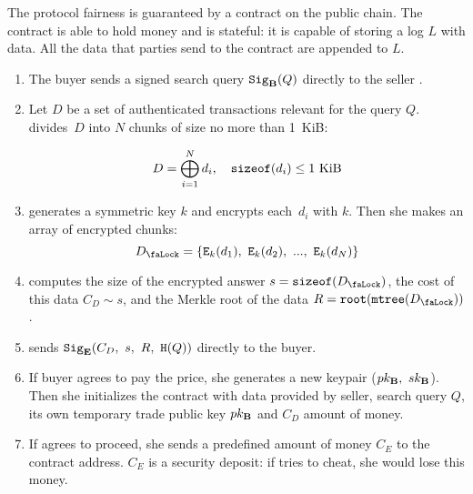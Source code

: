 The protocol fairness is guaranteed by a contract on the public chain. The contract is able to hold money and is stateful: it is capable of storing a log $L$ with data. All the data that parties send to the contract are appended to $L$.
\begin{enumerate}
\item The buyer  sends a signed search query $\mathtt{Sig}_{\mathbf{B}}(Q)$ directly to the seller .
\item Let $D$ be a set of authenticated transactions relevant for the query $Q$.  divides~$D$ into $N$ chunks of size no more than 1~KiB:

\begin{equation}
D = \bigoplus_{i=1}^N d_i, \quad \mathtt{sizeof}(d_i) \leq 1~\mathrm{KiB}
\end{equation}

\item {} generates a symmetric key $k$ and encrypts each~$d_i$ with $k$. Then she makes an array of encrypted chunks:
\begin{equation}
\Lock{D} = \{ \Encrypt_\Key{k}(d_1),\ \Encrypt_\Key{k}(d_2),\ ...,\ \Encrypt_\Key{k}(d_N) \}
\end{equation}

\item {} computes the size of the encrypted answer $s = \SizeOf(\Lock{D})$, the cost of this data $C_D \sim s$, and the Merkle root of the data $R = \Root(\MerkleTree(\Lock{D}))$.

\item {} sends $\Sign_\Party{E}(C_D,\ s,\ R,\ \Hash(Q))$ directly to the buyer.

\item If buyer agrees to pay the price, she generates a new keypair ($pk_{\mathbf{B}},\ sk_{\mathbf{B}}$). Then she initializes the contract with data provided by seller, search query $Q$, its own temporary trade public key $pk_{\mathbf{B}}$ and $C_D$ amount of money.

\item \label{step:seller-deposits-money} If  agrees to proceed, she sends a predefined amount of money $C_E$ to the contract address. $C_E$ is a security deposit: if  tries to cheat, she would lose this money.


\end{enumerate}
